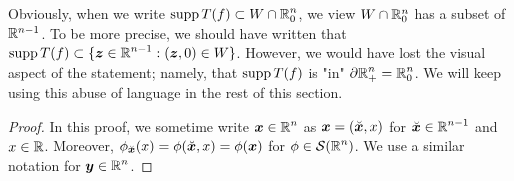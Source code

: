 \begin{rmk}
Obviously, when we write
$\displaystyle \operatorname{supp} T(f) \subset W \cap \mathbb{R}^n_0$, 
we view $W \cap \mathbb{R}^n_0$ has a subset of $\mathbb{R}^{n-1}$.  To be more
precise, we should have written that
$\displaystyle \operatorname{supp} T(f) \subset \{ {\bm{z}} \in \mathbb{R}^{n-1}:
({\bm{z}},0) \in W \}$.
However, we would have lost the visual
aspect of the statement; namely, that
$\displaystyle \operatorname{supp} T(f)$ is "in" $\displaystyle \partial \mathbb{R}^n_+ = \mathbb{R}^n_0$.
We will keep using this abuse of language in the rest of this section.
\end{rmk}

\begin{proof}
In this proof, we sometime write $\displaystyle {\bm{x}}\in \mathbb{R}^n$ as
${\bm{x}} = (\breve{{\bm{x}}}, x)$ for
$\displaystyle \breve{{\bm{x}}}\in \mathbb{R}^{n-1}$ and $x\in \mathbb{R}$.
Moreover,
$\phi_{\breve{{\bm{x}}}}(x) = \phi(\breve{{\bm{x}}},x) = \phi({\bm{x}})$ for
$\displaystyle \phi \in \mathcal{S}(\mathbb{R}^n)$.  We use a similar notation for
$\displaystyle {\bm{y}} \in \mathbb{R}^n$.


\end{proof}
